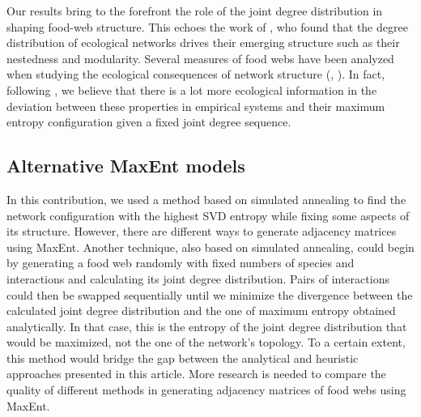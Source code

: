 Our results bring to the forefront the role of the joint degree distribution in
shaping food-web structure. This echoes the work of \textcite{Fortuna2010Nestedness},
who found that the degree distribution of ecological networks drives their
emerging structure such as their nestedness and modularity. Several measures of
food webs have been analyzed when studying the ecological consequences of
network structure (\cite{McCann2011Food}, \cite{Delmas2019Analysing}). In fact,
following \textcite{Williams2011Biology}, we believe that there is a lot more
ecological information in the deviation between these properties in empirical
systems and their maximum entropy configuration given a fixed joint degree
sequence.  

\subsection{Alternative MaxEnt models}

In this contribution, we used a method based on simulated annealing to find the
network configuration with the highest SVD entropy while fixing some aspects of
its structure. However, there are different ways to generate adjacency matrices
using MaxEnt. Another technique, also based on simulated annealing, could begin
by generating a food web randomly with fixed numbers of species and interactions
and calculating its joint degree distribution. Pairs of interactions could then
be swapped sequentially until we minimize the divergence between the calculated
joint degree distribution and the one of maximum entropy obtained analytically.
In that case, this is the entropy of the joint degree distribution that would be
maximized, not the one of the network's topology. To a certain extent, this
method would bridge the gap between the analytical and heuristic approaches
presented in this article. More research is needed to compare the quality of
different methods in generating adjacency matrices of food webs using MaxEnt.  

